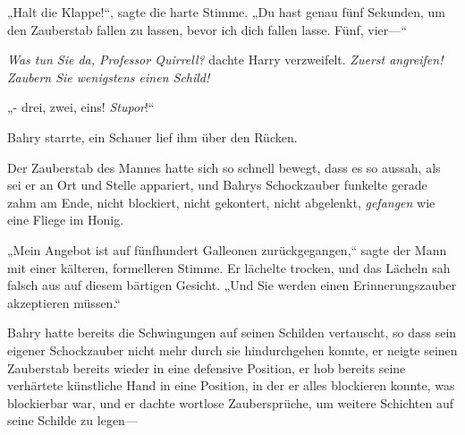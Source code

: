 „Halt die Klappe!“, sagte die harte Stimme. „Du hast genau fünf Sekunden, um den Zauberstab fallen zu lassen, bevor ich dich fallen lasse. Fünf, vier—“

\emph{Was tun Sie da, Professor Quirrell?} dachte Harry verzweifelt. \emph{Zuerst angreifen! Zaubern Sie wenigstens einen Schild!}

„- drei, zwei, eins! \emph{Stupor}!“

\later

Bahry starrte, ein Schauer lief ihm über den Rücken.

Der Zauberstab des Mannes hatte sich so schnell bewegt, dass es so aussah, als sei er an Ort und Stelle appariert, und Bahrys Schockzauber funkelte gerade zahm am Ende, nicht blockiert, nicht gekontert, nicht abgelenkt, \emph{gefangen} wie eine Fliege im Honig.

„Mein Angebot ist auf fünfhundert Galleonen zurückgegangen,“ sagte der Mann mit einer kälteren, formelleren Stimme. Er lächelte trocken, und das Lächeln sah falsch aus auf diesem bärtigen Gesicht. „Und Sie werden einen Erinnerungszauber akzeptieren müssen.“

Bahry hatte bereits die Schwingungen auf seinen Schilden vertauscht, so dass sein eigener Schockzauber nicht mehr durch sie hindurchgehen konnte, er neigte seinen Zauberstab bereits wieder in eine defensive Position, er hob bereits seine verhärtete künstliche Hand in eine Position, in der er alles blockieren konnte, was blockierbar war, und er dachte wortlose Zaubersprüche, um weitere Schichten auf seine Schilde zu legen—

